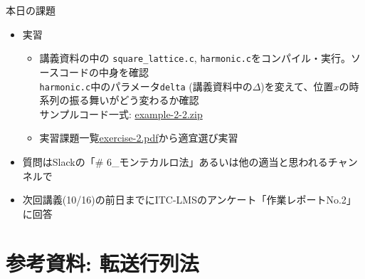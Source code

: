 \documentclass[10pt,dvipdfmx]{beamer}
\begin{document}
\section{}
\begin{frame}[t]{本日の課題}
  \begin{itemize}
  \item 実習
    \begin{itemize}
    \item 講義資料の中の {\tt square\_lattice.c}, {\tt harmonic.c}をコンパイル・実行。ソースコードの中身を確認 \\

      {\tt harmonic.c}中のパラメータ{\tt delta} (講義資料中の$\Delta$)を変えて、位置$x$の時系列の振る舞いがどう変わるか確認 \\
      
      サンプルコード一式: \href{https://github.com/todo-group/ComputerExperiments/releases/tag/2020a-computer2}{example-2-2.zip}
    \item 実習課題一覧\href{https://github.com/todo-group/ComputerExperiments/releases/tag/2020a-computer2}{exercise-2.pdf}から適宜選び実習
    \end{itemize}
  \item 質問はSlackの「\# 6\_モンテカルロ法」あるいは他の適当と思われるチャンネルで
  \item 次回講義(10/16)の前日までにITC-LMSのアンケート「作業レポートNo.2」に回答
  \end{itemize}
\end{frame}

\section{参考資料: 転送行列法}







\end{document}
